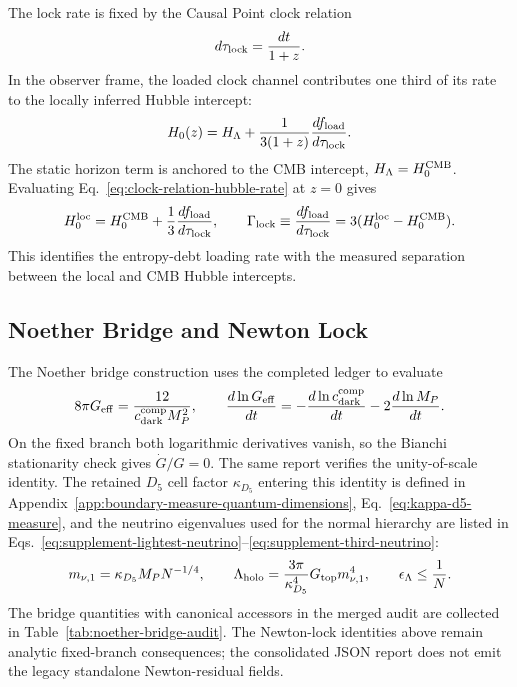 \documentclass[11pt]{article}
\newcommand{\cdarkcomp}{c_{\rm dark}^{\rm comp}}
\newcommand{\Lholo}{\Lambda_{\rm holo}}
\newcommand{\hcmb}{H_0^{\rm CMB}}
\newcommand{\hloc}{H_0^{\rm loc}}
\newcommand{\fload}{f_{\rm load}}
\newcommand{\GammaLock}{\Gamma_{\rm lock}}
\newcommand{\kappad}{\kappa_{D_5}}
\begin{document}
The lock rate is fixed by the Causal Point clock relation
\begin{equation}
\label{eq:causal-point-clock-relation-section-nine}
 d\tau_{\rm lock}
 =
 \frac{dt}{1+z}.
\end{equation}
In the observer frame, the loaded clock channel contributes one third of its
rate to the locally inferred Hubble intercept:
\begin{equation}
\label{eq:clock-relation-hubble-rate}
 H_0(z)
 =
 H_{\Lambda}
 +
 \frac{1}{3(1+z)}
 \frac{d\fload}{d\tau_{\rm lock}}.
\end{equation}
The static horizon term is anchored to the CMB intercept,
\(H_{\Lambda}=\hcmb\).  Evaluating Eq.~\eqref{eq:clock-relation-hubble-rate}
at \(z=0\) gives
\begin{equation}
\label{eq:gamma-lock-from-hubble-difference}
 \hloc
 =
 \hcmb+\frac{1}{3}\frac{d\fload}{d\tau_{\rm lock}},
 \qquad
 \GammaLock
 \equiv
 \frac{d\fload}{d\tau_{\rm lock}}
 =
 3(\hloc-\hcmb).
\end{equation}
This identifies the entropy-debt loading rate with the measured separation
between the local and CMB Hubble intercepts.

\subsection{Noether Bridge and Newton Lock}

The Noether bridge construction uses the completed ledger to evaluate
\begin{equation}
\label{eq:completion-newton-lock}
 8\pi G_{\rm eff}
 =
 \frac{12}{\cdarkcomp M_P^2},
 \qquad
 \frac{d\ln G_{\rm eff}}{dt}
 =
 -\frac{d\ln\cdarkcomp}{dt}-2\frac{d\ln M_P}{dt}.
\end{equation}
On the fixed branch both logarithmic derivatives vanish, so the Bianchi
stationarity check gives \(\dot G/G=0\).  The same report verifies the
unity-of-scale identity.  The retained \(D_5\) cell factor \(\kappad\) entering
this identity is defined in Appendix~\ref{app:boundary-measure-quantum-dimensions},
Eq.~\eqref{eq:kappa-d5-measure}, and the neutrino eigenvalues used for the
normal hierarchy are listed in
Eqs.~\eqref{eq:supplement-lightest-neutrino}--\eqref{eq:supplement-third-neutrino}:
\begin{equation}
\label{eq:cosmology-unity-scale}
 m_{\nu,1}=\kappad M_P N^{-1/4},
 \qquad
 \Lholo=\frac{3\pi}{\kappad^4}G_{\rm top}m_{\nu,1}^4,
 \qquad
 \epsilon_{\Lambda}\le\frac{1}{N}.
\end{equation}
The bridge quantities with canonical accessors in the merged audit are
collected in Table~\ref{tab:noether-bridge-audit}.  The Newton-lock identities
above remain analytic fixed-branch consequences; the consolidated JSON report
does not emit the legacy standalone Newton-residual fields.
\end{document}
